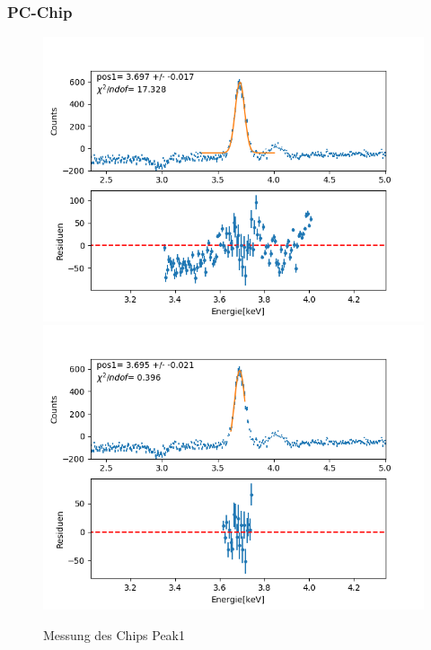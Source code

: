 \documentclass[12pt,a4paper]{article}
\begin{document}
\subsubsection{PC-Chip}
\begin{figure}[H]
\centering
\includegraphics[scale=0.49]{Bilder/roentgen_spektren/chip/chip1_1.png}
\includegraphics[scale=0.49]{Bilder/roentgen_spektren/chip/chip1_2.png}
\caption{Messung des Chips Peak1}
\end{figure}
\end{document}
